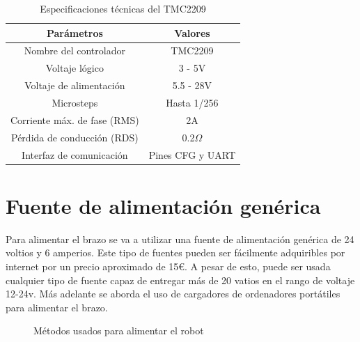\begin{table}[H]
\begin{center}
\begin{tabular}{|c|c|}
\hline
\textbf{Parámetros} & \textbf{Valores} \\
\hline
Nombre del controlador & TMC2209 \\
Voltaje lógico & 3 - 5V \\
Voltaje de alimentación & 5.5 - 28V \\
Microsteps & Hasta 1/256 \\
Corriente máx. de fase (RMS) & 2A \\
Pérdida de conducción (RDS) & 0.2$\Omega$ \\
Interfaz de comunicación & Pines CFG y UART \\
\hline
\end{tabular}
\caption{Especificaciones técnicas del TMC2209}
\label{cuadro:ejemplo}
\end{center}
\end{table}
    
\newpage
\section{Fuente de alimentación genérica}
\label{subsec:fuente_alimentacion}
Para alimentar el brazo se va a utilizar una fuente de alimentación genérica de 24 voltios y 6 amperios. Este tipo de fuentes pueden ser 
fácilmente adquiribles por internet por un precio aproximado de 15\euro. A pesar de esto, puede ser usada cualquier tipo de fuente capaz de 
entregar más de 20 vatios en el rango de voltaje 12-24v. Más adelante se aborda el uso de cargadores de ordenadores portátiles para alimentar el 
brazo.

\begin{figure} [h!]
  \centering    
  \hspace{3cm}
  \caption{Métodos usados para alimentar el robot}
\end{figure}


